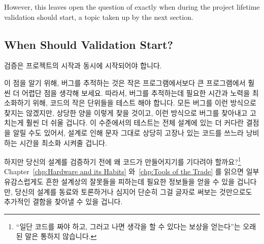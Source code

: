 However, this leaves open the question of exactly when during the project
lifetime validation should start, a topic taken up by the next section.
\fi

\subsection{When Should Validation Start?}
\label{sec:debugging:When Should Validation Start?}

검증은 프로젝트의 시작과 동시에 시작되어야 합니다.

이 점을 알기 위해, 버그를 추적하는 것은 작은 프로그램에서보다 큰 프로그램에서
훨씬 더 어렵단 점을 생각해 보세요.
따라서, 버그를 추적하는데 필요한 시간과 노력을 최소화하기 위해, 코드의 작은
단위들을 테스트 해야 합니다.
모든 버그를 이런 방식으로 찾지는 않겠지만, 상당한 양을 이렇게 찾을 것이고, 이런
방식으로 버그를 찾아내고 고치는게 훨씬 더 쉬울 겁니다.
이 수준에서의 테스트는 전체 설계에 있는 더 커다란 결점을 알릴 수도 있어서,
설계로 인해 문자 그대로 상당히 고장나 있는 코드를 쓰느라 낭비하는 시간을 최소화
시켜줄 겁니다.

하지만 당신의 설계를 검증하기 전에 왜 코드가 만들어지기를 기다려야
할까요?\footnote{
	``일단 코드를 짜야 하고, 그러고 나면 생각을 할 수 있다는 보상을
	얻는다''는 오래된 말은 통하지 않습니다.}
Chapter~\ref{chp:Hardware and its Habits}
와~\ref{chp:Tools of the Trade} 를 읽으면 일부 유감스럽게도 흔한 설계상의
잘못들을 피하는데 필요한 정보들을 얻을 수 있을 겁니다만, 당신의 설계를 동료와
토론하거나 심지어 단순히 그걸 글자로 써보는 것만으로도 추가적인 결함을 찾아낼
수 있을 겁니다.

